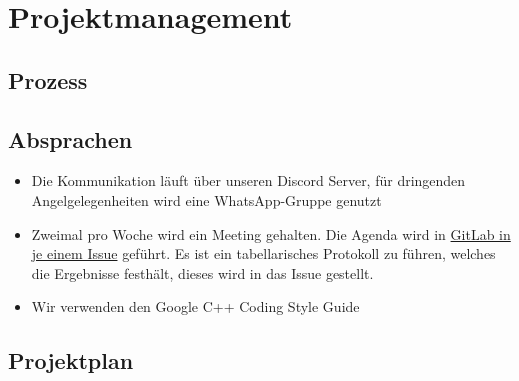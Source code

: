 \chapter{Projektmanagement}\label{ch:projektmanagement}



\section{Prozess}\label{sec:prozess}



\section{Absprachen}\label{sec:absprachen}

\begin{itemize}
    \item Die Kommunikation läuft über unseren Discord Server, für dringenden Angelgelegenheiten
    wird eine WhatsApp-Gruppe genutzt
    \item Zweimal pro Woche wird ein Meeting gehalten.
    Die Agenda wird in
    \href{https://git.haw-hamburg.de/ss21-esep-gruppe-2.3/esep/-/boards/2082?label_name[]=Protokoll}
    {GitLab in je einem Issue} geführt.
    Es ist ein tabellarisches Protokoll zu führen, welches die Ergebnisse festhält, dieses wird
    in das Issue gestellt.
    \item Wir verwenden den Google C++ Coding Style Guide
\end{itemize}



\section{Projektplan}\label{sec:projektplan}


